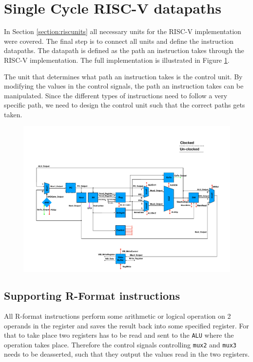 \section{Single Cycle RISC-V datapaths}\label{section:Datapaths}
    In Section \ref{section:riscunits} all necessary units for the RISC-V implementation were covered. The final step is to connect all units and define the instruction datapaths. The datapath is defined as the path an instruction takes through the RISC-V implementation. The full implementation is illustrated in Figure \ref{fig:RISCV}. 
    
    The unit that determines what path an instruction takes is the control unit. By modifying the values in the control signals, the path an instruction takes can be manipulated. Since the different types of instructions need to follow a very specific path, we need to design the control unit such that the correct paths gets taken.
    
    \begin{figure}[h!]
        \hspace*{-3.8cm}
        \centering
        \includegraphics[scale=0.8]{pictures/RISCV.pdf}
        \caption{}
        \label{fig:RISCV}
    \end{figure} 

    \subsection{Supporting R-Format instructions}\label{section:Rformat}
        All R-format instructions perform some arithmetic or logical operation on 2 operands in the register and saves the result back into some specified register. For that to take place two registers has to be read and sent to the \texttt{ALU} where the operation takes place. Therefore the control signals controlling \texttt{mux2} and \texttt{mux3} needs to be deasserted, such that they output the values read in the two registers. 
        
